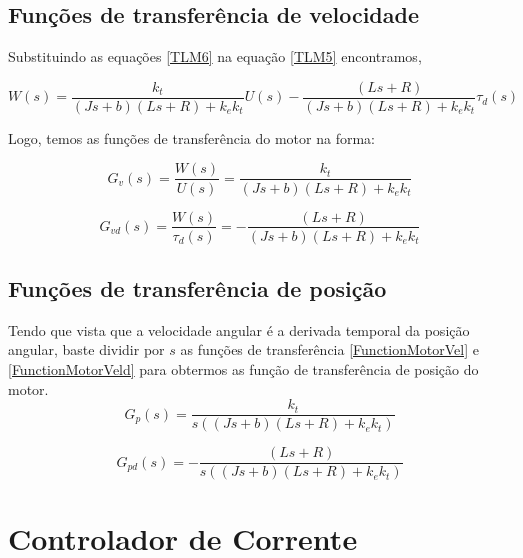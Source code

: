 \documentclass[]{politex}
\begin{document}
\section{Funções de transferência de velocidade}

Substituindo as equações \eqref{TLM6} na equação \eqref{TLM5} encontramos,

    \begin{equation}
     W(s) = \frac{k_{t}}{(J s + b)(L s + R) + k_{e} k_{t}} U(s) - \frac{(L s + R)}{(J s + b)(L s + R) + k_{e} k_{t}} \tau_d(s)
    \end{equation}

    Logo, temos as funções de transferência do motor na forma:
    
    \begin{equation}
    \label{FunctionMotorVel}
     G_v(s) = \frac{W(s)}{U(s)} = \frac{k_{t}}{(J s + b)(L s + R) + k_{e} k_{t}} 
    \end{equation}
    
    \begin{equation}
    \label{FunctionMotorVeld}
     G_{vd}(s) = \frac{W(s)}{\tau_{d}(s)} = - \frac{(L s + R)}{(J s + b)(L s + R) + k_{e} k_{t}}
    \end{equation}
    
\section{Funções de transferência de posição}

Tendo que vista que a velocidade angular é a derivada temporal da posição angular, baste dividir por $s$ as funções de transferência \eqref{FunctionMotorVel} e \eqref{FunctionMotorVeld} para obtermos as função de transferência de posição do motor.
    \begin{equation}
    \label{FunctionMotor}
     G_p(s) = \frac{k_{t}}{s((J s + b)(L s + R) + k_{e} k_{t})}
    \end{equation}
    
    \begin{equation}
    \label{FunctionMotord}
     G_{pd}(s) = - \frac{(L s + R)}{s((J s + b)(L s + R) + k_{e} k_{t})}
    \end{equation}


\chapter{Controlador de Corrente} \label{ap:ControladorDeCorrente}
\end{document}
